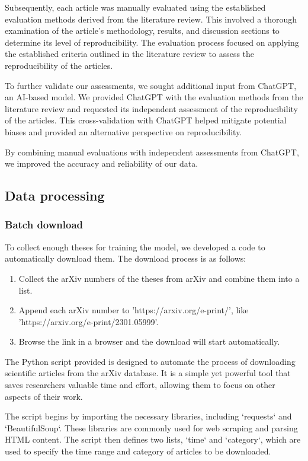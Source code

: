 \documentclass[12pt, a4paper, twocolumn]{article}
\begin{document}
		Subsequently, each article was manually evaluated using the established evaluation methods derived from the literature review. This involved a thorough examination of the article's methodology, results, and discussion sections to determine its level of reproducibility. The evaluation process focused on applying the established criteria outlined in the literature review to assess the reproducibility of the articles.
		
		To further validate our assessments, we sought additional input from ChatGPT, an AI-based model. We provided ChatGPT with the evaluation methods from the literature review and requested its independent assessment of the reproducibility of the articles. This cross-validation with ChatGPT helped mitigate potential biases and provided an alternative perspective on reproducibility.
		
		By combining manual evaluations with independent assessments from ChatGPT, we improved the accuracy and reliability of our data.
		\subsection{Data processing}
			\subsubsection{Batch download}

			To collect enough theses for training the model, we developed a code to automatically download them. The download process is as follows:
			
			\begin{enumerate}
			  \item Collect the arXiv numbers of the theses from arXiv and combine them into a list.
			  \item Append each arXiv number to 'https://arxiv.org/e-print/', like 'https://arxiv.org/e-print/2301.05999'.
			  \item Browse the link in a browser and the download will start automatically.
			\end{enumerate}
			
			The Python script provided is designed to automate the process of downloading scientific articles from the arXiv database. It is a simple yet powerful tool that saves researchers valuable time and effort, allowing them to focus on other aspects of their work.
			
			The script begins by importing the necessary libraries, including `requests` and `BeautifulSoup`. These libraries are commonly used for web scraping and parsing HTML content. The script then defines two lists, `time` and `category`, which are used to specify the time range and category of articles to be downloaded.
			
\end{document}
